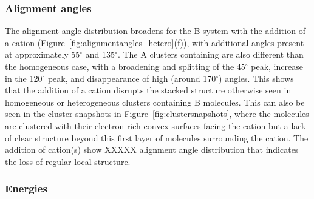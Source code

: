 \subsubsection{Alignment angles}
The alignment angle distribution broadens for the B system with the addition of a cation (Figure~\ref{fig:alignmentangles_hetero}(f)), with additional angles present at approximately 55$^{\circ}$ and 135$^{\circ}$.
The A clusters containing  are also different than the homogeneous case, with a broadening and splitting of the 45$^{\circ}$ peak, increase in the 120$^{\circ}$ peak, and disappearance of high (around 170$^{\circ}$) angles. This shows that the addition of a cation disrupts the stacked structure otherwise seen in homogeneous or heterogeneous clusters containing B molecules. This can also be seen in the cluster snapshots in Figure~\ref{fig:clustersnapshots}, where the molecules are clustered with their electron-rich convex surfaces facing the cation but a lack of clear structure beyond this first layer of molecules surrounding the cation.
The addition of cation(s) show XXXXX alignment angle distribution that indicates the loss of regular local structure.

\subsubsection{Energies}

